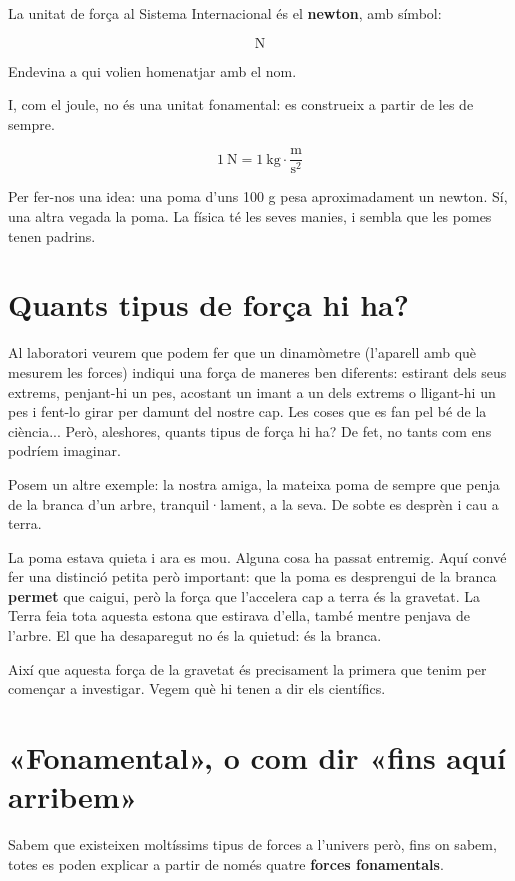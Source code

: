 La unitat de força al Sistema Internacional és el \textbf{newton}, amb símbol:

\[ \mathrm{N} \]

Endevina a qui volien homenatjar amb el nom.

I, com el joule, no és una unitat fonamental: es construeix a partir de les de sempre.

\[ 1\ \mathrm{N} = 1\ \mathrm{kg}\cdot\frac{\mathrm{m}}{\mathrm{s}^2} \]

Per fer-nos una idea: una poma d'uns 100 g pesa aproximadament un newton. Sí, una altra vegada la poma. La física té les seves manies, i sembla que les pomes tenen padrins.

\section{Quants tipus de força hi ha?}

Al laboratori veurem que podem fer que un dinamòmetre (l'aparell amb què mesurem les forces) indiqui una força de maneres ben diferents: estirant dels seus extrems, penjant-hi un pes, acostant un imant a un dels extrems o lligant-hi un pes i fent-lo girar per damunt del nostre cap. Les coses que es fan pel bé de la ciència... Però, aleshores, quants tipus de força hi ha? De fet, no tants com ens podríem imaginar.

Posem un altre exemple: la nostra amiga, la mateixa poma de sempre que penja de la branca d'un arbre, tranquil·lament, a la seva. De sobte es desprèn i cau a terra.

La poma estava quieta i ara es mou. Alguna cosa ha passat entremig. Aquí convé fer una distinció petita però important: que la poma es desprengui de la branca \textbf{permet} que caigui, però la força que l'accelera cap a terra és la gravetat. La Terra feia tota aquesta estona que estirava d'ella, també mentre penjava de l'arbre. El que ha desaparegut no és la quietud: és la branca.

Així que aquesta força de la gravetat és precisament la primera que tenim per començar a investigar. Vegem què hi tenen a dir els científics.


\section{«Fonamental», o com dir «fins aquí arribem»}

Sabem que existeixen moltíssims tipus de forces a l'univers però, fins on sabem, totes es poden explicar a partir de només quatre \textbf{forces fonamentals}.

